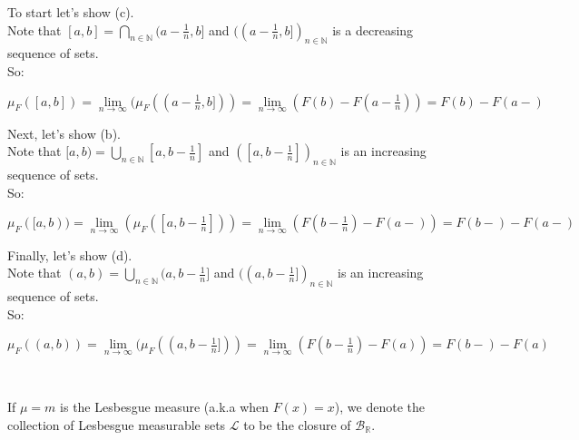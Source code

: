 \documentclass{book}
\newcommand{\hOne}{%
   \color{Black}%
   \fontsize{14}{16}\selectfont%
}
\newcommand{\exTwoP}{%
   \color{RedViolet}%
   \fontsize{13}{15}\selectfont%
}
\newcommand{\exPP}{%
   \color{RedViolet}%
   \fontsize{12}{14}\selectfont%
}
\newenvironment{myIndent}{%
   \begin{adjustwidth}{2.5em}{0em}%
}{%
   \end{adjustwidth}%
}
\newcommand{\mySepTwo}[1][.]{%
   {\noindent\color{#1}{\rule{6.5in}{0.5mm}}}\\%
}
\newcommand{\retTwo}{\hfill\bigbreak}
\begin{document}
\begin{myIndent}\exTwoP
   To start let's show (c).\\ Note that $[a, b] = \bigcap\limits_{n \in \mathbb{N}}(a - \frac{1}{n}, b]$ and $((a - \frac{1}{n}, b])_{n \in \mathbb{N}}$ is a decreasing sequence of sets.\\ [-8pt] So:

   {\centering\exPP $\mu_F([a, b]) = \lim\limits_{n \rightarrow \infty}(\mu_F((a - \frac{1}{n}, b])) = \lim\limits_{n \rightarrow \infty}(F(b) - F(a - \frac{1}{n})) = F(b) - F(a-)$\retTwo\par}

   Next, let's show (b).\\
   Note that $[a, b) = \bigcup\limits_{n \in \mathbb{N}}[a, b - \frac{1}{n}]$ and $([a, b- \frac{1}{n}])_{n \in \mathbb{N}}$ is an increasing sequence of sets.\\ [-8pt] So:

   {\centering\exPP $\mu_F([a, b)) = \lim\limits_{n \rightarrow \infty}(\mu_F([a, b-\frac{1}{n}])) = \lim\limits_{n \rightarrow \infty}(F(b - \frac{1}{n}) - F(a-)) = F(b-) - F(a-)$\retTwo\par}

   Finally, let's show (d).\\
   Note that $(a, b) = \bigcup\limits_{n \in \mathbb{N}}(a, b-\frac{1}{n}]$ and $((a, b- \frac{1}{n}])_{n \in \mathbb{N}}$ is an increasing sequence of sets.\\ [-8pt] So:

   {\centering\exPP $\mu_F((a, b)) = \lim\limits_{n \rightarrow \infty}(\mu_F((a, b-\frac{1}{n}])) = \lim\limits_{n \rightarrow \infty}(F(b - \frac{1}{n}) - F(a)) = F(b-) - F(a)$\retTwo\par}
\end{myIndent}

\mySepTwo\hOne

If $\mu = m$ is the Lesbesgue measure (a.k.a when $F(x) = x$), we denote the collection of Lesbesgue measurable sets $\mathcal{L}$ to be the closure of $\mathcal{B}_\mathbb{R}$.\retTwo
\end{document}
